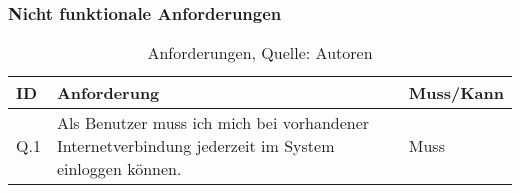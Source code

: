 \subsubsection{Nicht funktionale Anforderungen}
\begin{table}[H]
    \setlength\extrarowheight{2pt} %
    \begin{tabularx}{\textwidth}{|l|X|l|}
        \hline
        \textbf{ID} &  \textbf{Anforderung} & \textbf{Muss/Kann}  \\
        \hline
        Q.1 & Als Benutzer muss ich mich bei vorhandener Internetverbindung jederzeit im System einloggen können. & Muss \\
        \hline
    \end{tabularx}
    \caption{ \label{tbl: Anforderungen an die Qualitaet}Anforderungen, Quelle: Autoren}
\end{table}
\newpage
